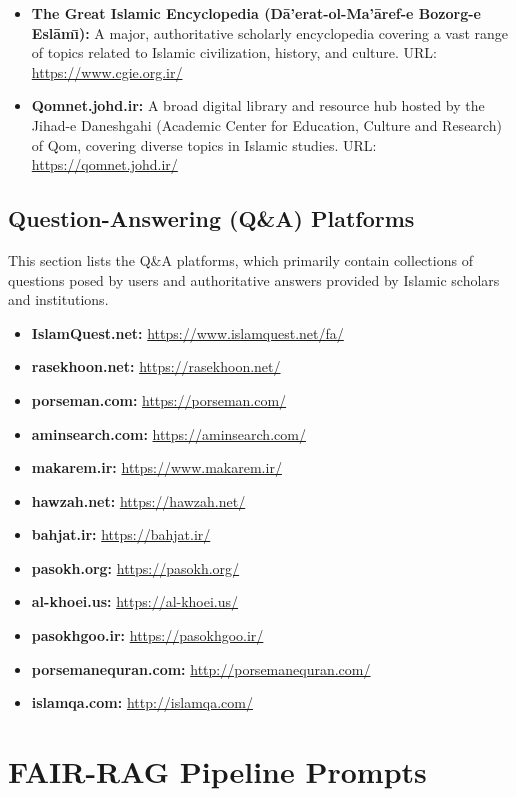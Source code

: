 \documentclass[11pt]{article}
\begin{document}
\begin{itemize}
    \item \textbf{The Great Islamic Encyclopedia (D\={a}'erat-ol-Ma'\={a}ref-e Bozorg-e Esl\={a}m\={\i}):} A major, authoritative scholarly encyclopedia covering a vast range of topics related to Islamic civilization, history, and culture. URL: \url{https://www.cgie.org.ir/}
    
    \item \textbf{Qomnet.johd.ir:} A broad digital library and resource hub hosted by the Jihad-e Daneshgahi (Academic Center for Education, Culture and Research) of Qom, covering diverse topics in Islamic studies. URL: \url{https://qomnet.johd.ir/}
\end{itemize}

\subsection{Question-Answering (Q\&A) Platforms}

This section lists the Q\&A platforms, which primarily contain collections of questions posed by users and authoritative answers provided by Islamic scholars and institutions.

\begin{itemize}
    \item \textbf{IslamQuest.net:} \url{https://www.islamquest.net/fa/}
    \item \textbf{rasekhoon.net:} \url{https://rasekhoon.net/}
    \item \textbf{porseman.com:} \url{https://porseman.com/}
    \item \textbf{aminsearch.com:} \url{https://aminsearch.com/}
    \item \textbf{makarem.ir:} \url{https://www.makarem.ir/}
    \item \textbf{hawzah.net:} \url{https://hawzah.net/}
    \item \textbf{bahjat.ir:} \url{https://bahjat.ir/}
    \item \textbf{pasokh.org:} \url{https://pasokh.org/}
    \item \textbf{al-khoei.us:} \url{https://al-khoei.us/}
    \item \textbf{pasokhgoo.ir:} \url{https://pasokhgoo.ir/}
    \item \textbf{porsemanequran.com:} \url{http://porsemanequran.com/}
    \item \textbf{islamqa.com:} \url{http://islamqa.com/}
\end{itemize}

\section{FAIR-RAG Pipeline Prompts}
\label{sec:appendix-prompts}
\end{document}
